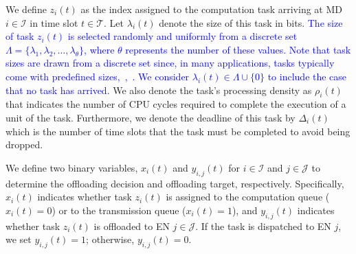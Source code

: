 \documentclass[12pt,draftclsnofoot,onecolumn]{IEEEtran}
\begin{document}
We define $z_i(t)$ as the index assigned to the computation task arriving at MD $i \in \mathcal{I}$ in time slot $t \in \mathcal{T}$. Let $\lambda_i(t)$ denote the size of this task in bits. \textcolor{blue}{The size of task \( z_i(t) \) is selected randomly and uniformly from a discrete set \( \Lambda = \{\lambda_1, \lambda_2, \ldots, \lambda_{\theta}\} \), where \( \theta \) represents the number of these values. Note that task sizes are drawn from a discrete set since, in many applications, tasks typically come with predefined sizes,~\cite{wang2020intelligent},~\cite{zhang2019toward}. We consider $\lambda_i(t) \in \Lambda \cup \{0\}$ to include the case that no task has arrived.} We also denote the task's processing density as $\rho_i(t)$ that indicates the number of CPU cycles required to complete the execution of a unit of the task. Furthermore, we denote the deadline of this task by $\Delta_i(t)$ which is the number of time slots that the task must be completed to avoid being dropped.


We define two binary variables, $x_i(t)$ and $y_{i,j}(t)$ for $i \in \mathcal{I}$ and $j \in \mathcal{J}$ to determine the offloading decision and offloading target, respectively. Specifically, $x_i(t)$ indicates whether task $z_i(t)$ is assigned to the computation queue ($x_i(t) = 0$) or to the transmission queue ($x_i(t) = 1$), and $y_{i,j}(t)$ indicates whether task $z_i(t)$ is offloaded to EN $j \in \mathcal{J}$. If the task is dispatched to EN $j$, we set $y_{i,j}(t) = 1$; otherwise, $y_{i,j}(t) = 0$.
\end{document}

